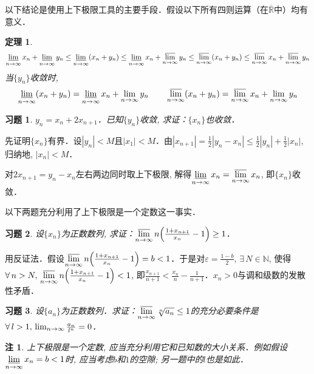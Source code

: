 \documentclass[11pt,a4paper]{ctexart}
\makeatletter
\theoremstyle{thmseries} %
\newtheorem{thm}{定理}[section]
\theoremstyle{exerseries}
\newtheorem{exer}{习题}[section]
\newtheorem*{rem}{注}
\renewenvironment{proof}[1][\proofname]{\par
  \pushQED{\qed}%
  \normalfont \topsep6\p@\@plus6\p@\relax
  \trivlist
  \item[\hskip\labelsep
        \itshape
    #1\@addpunct{}]\ignorespaces
}{%
  \popQED\endtrivlist\@endpefalse
}
\newenvironment{pf}{\begin{proof}[\bfseries\upshape 证\quad]}{\end{proof}}
\newcommand{\bra}[1]{\mathopen{}\left(#1\right)}
\newcommand{\cbra}[1]{\mathopen{}\left\{#1\right\}}
\renewcommand{\epsilon}{\varepsilon}
\newcommand{\R}{\mathbb{R}}
\newcommand{\N}{\mathbb{N}}
\def \nti {\mathnormal{n}\to\infty}
\DeclareMathOperator{\llim}{\underset{\nti}{\underline{\lim}}}
\DeclareMathOperator{\ulim}{\underset{\nti}{\overline{\lim}}}
\makeatother
\begin{document}
以下结论是使用上下极限工具的主要手段．假设以下所有四则运算（在$\overline{\R}$中）均有意义．
\begin{thm}
	\[\llim x_n+\llim y_n\leq\llim\bra{x_n+y_n}\leq\llim x_n+\ulim y_n\leq\ulim\bra{x_n+y_n}\leq\ulim x_n+\ulim y_n\]
	当$\{y_n\}$收敛时, 
	\[\llim\bra{x_n+y_n}=\llim x_n+\lim_{\nti} y_n\qquad\ulim\bra{x_n+y_n}=\ulim x_n+\lim_{\nti} y_n\]
\end{thm}

\begin{exer}
	$y_n=x_n+2x_{n+1}$．已知$\{y_n\}$收敛, 求证：$\{x_n\}$也收敛．
\end{exer}
\begin{pf}
	先证明$\{x_n\}$有界．设$|y_n|<M$且$|x_1|<M$．由$|x_{n+1}|=\frac{1}{2}|y_n-x_n|\leq\frac{1}{2}|y_n|+\frac{1}{2}|x_n|$, 归纳地, $|x_n|<M$．

	对$2x_{n+1}=y_n-x_n$左右两边同时取上下极限, 解得$\llim x_n=\ulim x_n$, 即$\{x_n\}$收敛．
\end{pf}


以下两题充分利用了上下极限是一个定数这一事实．
\begin{exer}
	设$\{x_n\}$为正数数列, 求证：$\ulim n\bra{\frac{1+x_{n+1}}{x_n}-1}\geq1$．
\end{exer}
\begin{pf}
	用反证法．假设$\ulim n\bra{\frac{1+x_{n+1}}{x_n}-1}=b<1$．于是对$\epsilon=\frac{1-b}{2},\,\exists\,N\in\N$, 使得$\forall\,n>N,\,\ulim n\bra{\frac{1+x_{n+1}}{x_n}-1}<1$, 即$\frac{x_{n+1}}{n+1}<\frac{x_n}{n}-\frac{1}{n+1}$．$x_n>0$与调和级数的发散性矛盾．
\end{pf}

\begin{exer}
	设$\{a_n\}$为正数数列．求证：$\ulim \sqrt[n]{a_n}\leq1$的充分必要条件是$\forall\,l>1,\,\lim_{\nti}\frac{a_n}{l^n}=0$．
\end{exer}
\begin{rem}
	上下极限是一个定数, 应当充分利用它和已知数的大小关系．例如假设$\llim x_n=b<1$时, 应当考虑$b$和$1$的空隙; 另一题中的$l$也是如此．
\end{rem}
\end{document}

